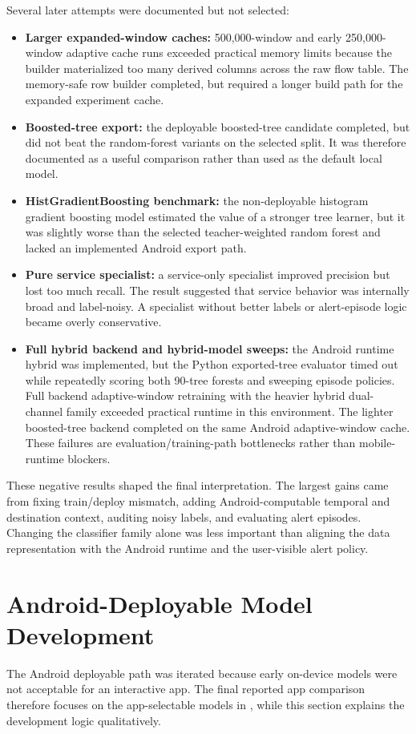 Several later attempts were documented but not selected:
\begin{itemize}[leftmargin=*]
  \item \textbf{Larger expanded-window caches:} 500,000-window and early 250,000-window adaptive
  cache runs exceeded practical memory limits because the builder materialized too many derived
  columns across the raw flow table. The memory-safe row builder completed, but required a longer
  build path for the expanded experiment cache.
  \item \textbf{Boosted-tree export:} the deployable boosted-tree candidate completed, but did not
  beat the random-forest variants on the selected split. It was therefore documented as a useful
  comparison rather than used as the default local model.
  \item \textbf{HistGradientBoosting benchmark:} the non-deployable histogram gradient boosting
  model estimated the value of a stronger tree learner, but it was slightly worse than the selected
  teacher-weighted random forest and lacked an implemented Android export path.
  \item \textbf{Pure service specialist:} a service-only specialist improved precision but lost too
  much recall. The result suggested that service behavior was internally broad and label-noisy. A
  specialist without better labels or alert-episode logic became overly conservative.
  \item \textbf{Full hybrid backend and hybrid-model sweeps:} the Android runtime hybrid was
  implemented, but the Python exported-tree evaluator timed out while repeatedly scoring both
  90-tree forests and sweeping episode policies. Full backend adaptive-window retraining with the
  heavier hybrid dual-channel family exceeded practical runtime in this environment. The lighter
  boosted-tree backend completed on the same Android adaptive-window cache. These failures are
  evaluation/training-path bottlenecks rather than mobile-runtime blockers.
\end{itemize}

These negative results shaped the final interpretation. The largest gains came from fixing
train/deploy mismatch, adding Android-computable temporal and destination context, auditing noisy
labels, and evaluating alert episodes. Changing the classifier family alone was less important than
aligning the data representation with the Android runtime and the user-visible alert policy.

\section{Android-Deployable Model Development}
The Android deployable path was iterated because early on-device models were not acceptable for an
interactive app. The final reported app comparison therefore focuses on the app-selectable models in
, while this section explains the development logic qualitatively.

